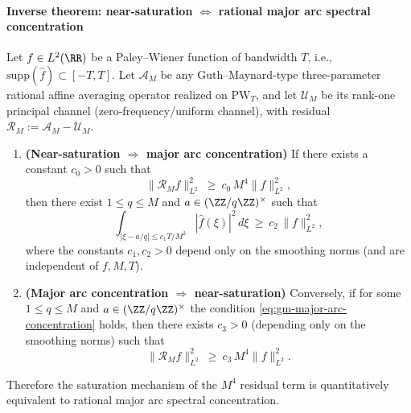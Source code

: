 \paragraph{Inverse theorem: near-saturation \texorpdfstring{$\Longleftrightarrow$}{<->} rational major arc spectral concentration}
\begin{theorem}\label{thm:gm-affine-inverse-major-arc}
Let \(f\in L^2(\RR)\) be a Paley--Wiener function of bandwidth \(T\), i.e., \(\mathrm{supp}(\widehat f)\subset[-T,T]\).
Let \(\mathcal{A}_M\) be any Guth--Maynard-type three-parameter rational affine averaging operator realized on \(\mathrm{PW}_T\), and let \(\mathcal{U}_M\) be its rank-one principal channel (zero-frequency/uniform channel), with residual \(\mathcal{R}_M:=\mathcal{A}_M-\mathcal{U}_M\).
\begin{enumerate}
  \item \textbf{(Near-saturation \(\Rightarrow\) major arc concentration)} If there exists a constant \(c_0>0\) such that
  \[
  \|\mathcal{R}_M f\|_{L^2}^2\ \ge\ c_0\,M^{4}\|f\|_{L^2}^2,
  \]
  then there exist \(1\le q\le M\) and \(a\in(\ZZ/q\ZZ)^\times\) such that
  \begin{equation}\label{eq:gm-major-arc-concentration}
  \int_{|\xi-a/q|\le c_1T/M^{2}} |\widehat f(\xi)|^2\,d\xi\ \ge\ c_2\,\|f\|_{L^2}^2,
  \end{equation}
  where the constants \(c_1,c_2>0\) depend only on the smoothing norms (and are independent of \(f,M,T\)).
  \item \textbf{(Major arc concentration \(\Rightarrow\) near-saturation)} Conversely, if for some \(1\le q\le M\) and \(a\in(\ZZ/q\ZZ)^\times\) the condition \eqref{eq:gm-major-arc-concentration} holds, then there exists \(c_3>0\) (depending only on the smoothing norms) such that
  \[
  \|\mathcal{R}_M f\|_{L^2}^2\ \ge\ c_3\,M^{4}\|f\|_{L^2}^2.
  \]
\end{enumerate}
Therefore the saturation mechanism of the \(M^4\) residual term is quantitatively equivalent to rational major arc spectral concentration.
\end{theorem}

